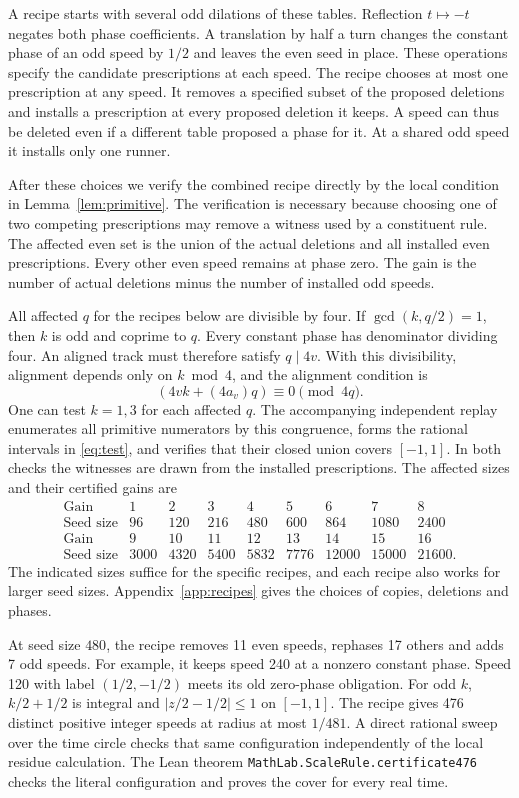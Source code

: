 \documentclass[11pt]{article}
\theoremstyle{definition}
\begin{document}
A recipe starts with several odd dilations of these tables. Reflection
\(t\mapsto-t\) negates both phase coefficients. A translation by half a
turn changes the constant phase of an odd speed by \(1/2\) and leaves
the even seed in place. These operations specify the candidate
prescriptions at each speed. The recipe chooses at most one
prescription at any speed. It removes a specified subset of the
proposed deletions and installs a prescription at every proposed
deletion it keeps. A speed can thus be deleted even if a different
table proposed a phase for it. At a shared odd speed it installs only
one runner.

After these choices we verify the combined recipe directly by the
local condition in Lemma~\ref{lem:primitive}. The verification is
necessary because choosing one of two competing prescriptions may
remove a witness used by a constituent rule. The affected even set is
the union of the actual deletions and all installed even
prescriptions. Every other even speed remains at phase zero.
The gain is the number of actual deletions minus the number of
installed odd speeds.

All affected \(q\) for the recipes below are divisible by four.
If \(\gcd(k,q/2)=1\), then \(k\) is odd and coprime to \(q\).
Every constant phase has denominator dividing four. An aligned
track must therefore satisfy \(q\mid 4v\). With this divisibility,
alignment depends only on \(k\bmod 4\), and the alignment condition is
\[
   (4vk+(4a_v)q)\equiv0\pmod{4q}.
\]
One can test \(k=1,3\) for each affected \(q\). The accompanying
independent replay enumerates all primitive numerators by this congruence,
forms the rational intervals in \eqref{eq:test}, and verifies that their
closed union covers \([-1,1]\). In both checks the witnesses are drawn
from the installed prescriptions. The affected sizes and their
certified gains are
\[
\begin{array}{c|rrrrrrrr}
 \text{Gain} &1&2&3&4&5&6&7&8\\ \hline
 \text{Seed size} &96&120&216&480&600&864&1080&2400\\[2pt]
 \text{Gain} &9&10&11&12&13&14&15&16\\ \hline
 \text{Seed size} &3000&4320&5400&5832&7776&12000&15000&21600 .
\end{array}
\]
The indicated sizes suffice for the specific recipes, and each recipe
also works for larger seed sizes. Appendix~\ref{app:recipes} gives
the choices of copies, deletions and phases.

At seed size \(480\), the recipe removes 11 even speeds, rephases
17 others and adds 7 odd speeds. For example, it keeps speed 240
at a nonzero constant phase. Speed 120 with label \((1/2,-1/2)\)
meets its old zero-phase obligation. For odd \(k\), \(k/2+1/2\)
is integral and \(\lvert z/2-1/2\rvert\le1\) on \([-1,1]\).
The recipe gives 476 distinct positive integer speeds at radius at
most \(1/481\). A direct rational sweep
over the time circle checks that same configuration independently of
the local residue calculation. The Lean theorem
\texttt{MathLab.ScaleRule.certificate476} checks the literal
configuration and proves the cover for every real time.
\end{document}
